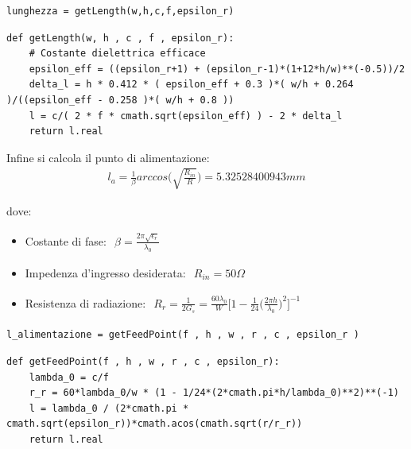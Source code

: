 \begin{verbatim}
lunghezza = getLength(w,h,c,f,epsilon_r)
\end{verbatim}
\begin{verbatim}
def getLength(w, h , c , f , epsilon_r):
    # Costante dielettrica efficace
    epsilon_eff = ((epsilon_r+1) + (epsilon_r-1)*(1+12*h/w)**(-0.5))/2
    delta_l = h * 0.412 * ( epsilon_eff + 0.3 )*( w/h + 0.264 )/((epsilon_eff - 0.258 )*( w/h + 0.8 ))
    l = c/( 2 * f * cmath.sqrt(epsilon_eff) ) - 2 * delta_l
    return l.real
\end{verbatim}

Infine si calcola il punto di alimentazione:
\begin{align}
l_a = \frac{1}{\beta} arccos\biggr(\sqrt{\frac{R_{in}}{R}}\biggr) = 5.32528400943 mm
\end{align}

dove: 
\begin{itemize}
\item Costante di fase:
$\begin{aligned}
\beta = \frac{2 \pi \sqrt{\epsilon_r}}{\lambda_0} 
\end{aligned}$
\item Impedenza d'ingresso desiderata:
$\begin{aligned}
R_{in} = 50 \Omega
\end{aligned}$
\item Resistenza di radiazione:
$\begin{aligned}
R_r = \frac{1}{2G_s} = \frac{60 \lambda_0}{W} \biggr[ 1-\frac{1}{24} \biggr( \frac{2 \pi h}{\lambda_0} \biggr) ^2 \biggr] ^{-1}
\end{aligned}$
\end{itemize}
\begin{verbatim}
l_alimentazione = getFeedPoint(f , h , w , r , c , epsilon_r )
\end{verbatim}

\begin{verbatim}
def getFeedPoint(f , h , w , r , c , epsilon_r):
    lambda_0 = c/f
    r_r = 60*lambda_0/w * (1 - 1/24*(2*cmath.pi*h/lambda_0)**2)**(-1)
    l = lambda_0 / (2*cmath.pi * cmath.sqrt(epsilon_r))*cmath.acos(cmath.sqrt(r/r_r))
    return l.real
\end{verbatim}

